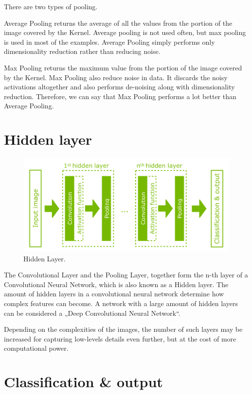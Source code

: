 \documentclass[a4paper,13pt,twoside]{book}
\begin{document}
There are two types of pooling.

Average Pooling returns the average of all the values from the portion of the image covered by the Kernel.
Average pooling is not used often, but max pooling is used in most of the examples.
Average Pooling simply performs only dimensionality reduction rather than reducing noise.

Max Pooling returns the maximum value from the portion of the image covered by the Kernel.
Max Pooling also reduce noise in data. It discards the noisy activations altogether and also performs de-noising along with dimensionality reduction.
Therefore, we can say that Max Pooling performs a lot better than Average Pooling.

\section{Hidden layer}

\begin{figure}[h!]
  \includegraphics[width=\linewidth]{Images/hiddenlayer(19).png}
  \caption{Hidden Layer.}
  \label{fig:hiddenlayer}
\end{figure}

The Convolutional Layer and the Pooling Layer, together form the n-th layer of a Convolutional Neural Network, which is also known as a Hidden layer.
The amount of hidden layers in a convolutional neural network determine how complex features can become. A network with a large amount of hidden layers can be considered a „Deep Convolutional Neural Network“.

Depending on the complexities of the images, the number of such layers may be increased for capturing low-levels details even further, but at the cost of more computational power.

\section{Classification & output}
\end{document}
